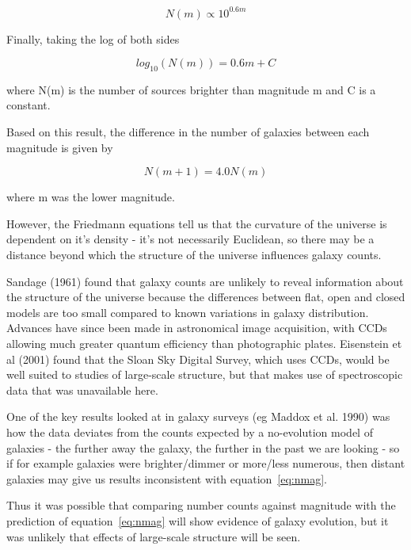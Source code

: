 \documentclass[a4paper,11pt,twoside]{article}
\begin{document}
\begin{equation}
N(m) \propto 10^{0.6m}
\end{equation}

Finally, taking the log of both sides

\begin{equation}
\label{eq:nmag}
log_{10}(N(m)) = 0.6m + C
\end{equation}

where N(m) is the number of sources brighter than magnitude m and 
C is a constant.

Based on this result, the difference in the number of galaxies between
each magnitude is given by

\begin{equation}
N(m+1) = 4.0N(m)
\end{equation}

where m was the lower magnitude.

However, the Friedmann equations tell us that the curvature of the 
universe is dependent on it's density - it's not necessarily Euclidean,
so there may be a distance beyond which the structure of the universe 
influences galaxy counts.

Sandage (1961)\cite{sandage} found that galaxy counts are unlikely 
to reveal information about the structure of the universe because the 
differences between flat, open and closed models are too small compared 
to known variations in galaxy distribution. Advances have since been 
made in astronomical image acquisition, with CCDs allowing much greater 
quantum efficiency than photographic plates. Eisenstein et al (2001)\cite{eisen} 
found that the Sloan Sky Digital Survey, which uses CCDs, would be 
well suited to studies of large-scale structure, but that makes use 
of spectroscopic data that was unavailable here.

One of the key results looked at in galaxy surveys 
(eg Maddox et al. 1990)\cite{maddox} was how the data deviates from 
the counts expected by a no-evolution model of galaxies - the further 
away the galaxy, the further in the past we are looking - so if for 
example galaxies were brighter/dimmer or more/less numerous, then 
distant galaxies may give us results inconsistent with equation~\ref{eq:nmag}.

Thus it was possible that comparing number counts against magnitude 
with the prediction of equation~\ref{eq:nmag} will show evidence of 
galaxy evolution, but it was unlikely that effects of large-scale
structure will be seen.
\end{document}
